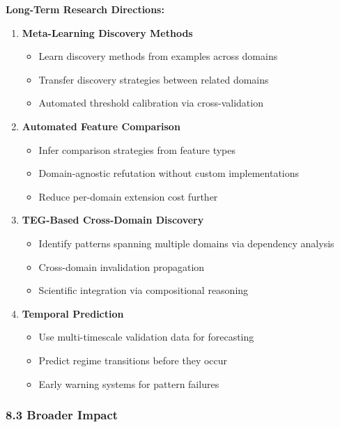 \documentclass[
]{article}
\providecommand{\tightlist}{%
  \setlength{\itemsep}{0pt}\setlength{\parskip}{0pt}}
\begin{document}
\textbf{Long-Term Research Directions:}

\begin{enumerate}
\def\labelenumi{\arabic{enumi}.}
\setcounter{enumi}{3}
\tightlist
\item
  \textbf{Meta-Learning Discovery Methods}

  \begin{itemize}
  \tightlist
  \item
    Learn discovery methods from examples across domains
  \item
    Transfer discovery strategies between related domains
  \item
    Automated threshold calibration via cross-validation
  \end{itemize}
\item
  \textbf{Automated Feature Comparison}

  \begin{itemize}
  \tightlist
  \item
    Infer comparison strategies from feature types
  \item
    Domain-agnostic refutation without custom implementations
  \item
    Reduce per-domain extension cost further
  \end{itemize}
\item
  \textbf{TEG-Based Cross-Domain Discovery}

  \begin{itemize}
  \tightlist
  \item
    Identify patterns spanning multiple domains via dependency analysis
  \item
    Cross-domain invalidation propagation
  \item
    Scientific integration via compositional reasoning
  \end{itemize}
\item
  \textbf{Temporal Prediction}

  \begin{itemize}
  \tightlist
  \item
    Use multi-timescale validation data for forecasting
  \item
    Predict regime transitions before they occur
  \item
    Early warning systems for pattern failures
  \end{itemize}
\end{enumerate}

\subsubsection{8.3 Broader Impact}\label{broader-impact}
\end{document}
